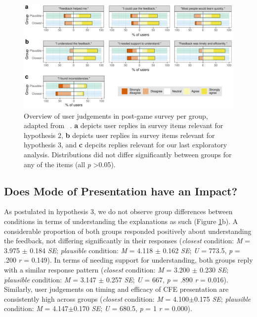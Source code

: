 \begin{figure}
   \centering
   \includegraphics[width=\textwidth]{./media/H2_H3_expl_survey_T_PAZ_FINAL.pdf}
   \caption{Overview of user judgements in post-game survey per group, adapted from ~\citep{holzinger_measuring_2020}. \textbf{a} depicts user replies in survey items relevant for hypothesis 2, \textbf{b} depicts user replies in survey items relevant for hypothesis 3, and \textbf{c} depcits replies relevant for our last exploratory analysis. Distributions did not differ significantly between groups for any of the items (all \textit{p} \textgreater 0.05).}
   \label{fig:survey}
 \end{figure}

\subsection{Does Mode of Presentation have an Impact?}
As postulated in hypothesis 3, we do not observe group differences between conditions in terms of understanding the explanations as such (Figure \ref{fig:survey}b). 
A considerable proportion of both groups responded positively about understanding the feedback, not differing significantly in their responses (\textit{closest} condition: \textit{M} = 3.975 $\pm$ 0.184 \textit{SE}; \textit{plausible} condition: \textit{M} = 4.118 $\pm$ 0.162 \textit{SE}; \textit{U} = 773.5, \textit{p} = .200 \textit{r} = 0.149).
In terms of needing support for understanding, both groups reply with a similar response pattern (\textit{closest} condition: \textit{M} = 3.200 $\pm$ 0.230 \textit{SE}; \textit{plausible} condition: \textit{M} = 3.147 $\pm$ 0.257 \textit{SE}; \textit{U} = 667, \textit{p} = .890 \textit{r} = 0.016).
Similarly, user judgements on timing and efficacy of  CFE presentation are consistently high across groups (\textit{closest} condition: \textit{M} = 4.100$\pm$0.175 \textit{SE}; \textit{plausible} condition: \textit{M} = 4.147$\pm$0.170 \textit{SE}; \textit{U} = 680.5, \textit{p} = 1 \textit{r} = 0.000).

